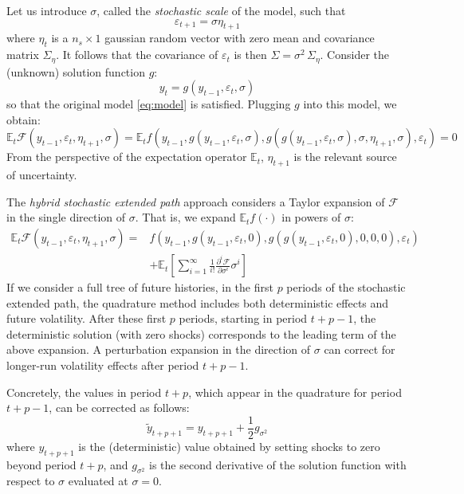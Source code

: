 \documentclass[a4paper,12pt]{amsart}
\begin{document}
Let us introduce $\sigma$, called the \emph{stochastic scale} of the model, such that
\[
   \varepsilon_{t+1} = \sigma \eta_{t+1}
\]
where $\eta_t$ is a $n_s\times 1$ gaussian random vector with zero mean
and covariance matrix $\Sigma_{\eta}$. It follows that the covariance of $\varepsilon_{t}$
is then $\Sigma = \sigma^2 \,\Sigma_{\eta}$. Consider the (unknown) solution function $g$:
\[
   y_t = g\left(y_{t-1}, \varepsilon_t, \sigma\right)
\]
so that the original model \ref{eq:model} is satisfied. Plugging $g$ into this model, we obtain:
\[
   \mathbb E_t\mathcal F\left( y_{t-1}, \varepsilon_t, \eta_{t+1}, \sigma\right)
   =
   \mathbb E_t f\left(
   y_{t-1},
   g\left(y_{t-1},\varepsilon_t,\sigma\right),
   g\left(g\left(y_{t-1}, \varepsilon_t,\sigma\right), \sigma, \eta_{t+1}, \sigma\right),
   \varepsilon_t\right) = 0
\]
From the perspective of the expectation operator $\mathbb E_t$, $\eta_{t+1}$ is the relevant source of uncertainty.\newline

The \emph{hybrid stochastic extended path} approach considers a Taylor expansion
of $\mathcal F$ in the single direction of $\sigma$. That is, we expand
$\mathbb E_t f(\cdot)$ in powers of $\sigma$:
\[
   \begin{split}
      \mathbb E_t\mathcal F\left( y_{t-1}, \varepsilon_t, \eta_{t+1}, \sigma\right) =
       & f\left(y_{t-1}, g\left(y_{t-1},\varepsilon_t,0\right),
      g\left(g\left(y_{t-1}, \varepsilon_t,0\right), 0, 0, 0\right),
      \varepsilon_t\right)                                                                                             \\
       & +\mathbb E_t\left[\sum_{i=1}^{\infty}\frac{1}{i!}\frac{\partial^i\mathcal F}{\partial\sigma^i}\sigma^i\right]
   \end{split}
\]
If we consider a full tree of future histories, in the first $p$
periods of the stochastic extended path, the quadrature method
includes both deterministic effects and future volatility. After these
first $p$ periods, starting in period $t+p-1$, the deterministic
solution (with zero shocks) corresponds to the leading term of the
above expansion.  A perturbation expansion in the direction
of $\sigma$ can correct for longer-run volatility effects after
period $t+p-1$.\newline

Concretely, the values in period $t+p$, which appear in the quadrature for period $t+p-1$, can be corrected
as follows:
\[
   \widetilde{y}_{t+p+1}
   = y_{t+p+1}
   +
   \frac{1}{2}g_{\sigma^2}
\]
where $y_{t+p+1}$ is the (deterministic) value obtained by setting shocks to zero
beyond period $t+p$, and $g_{\sigma^2}$ is the second derivative of the solution
function with respect to $\sigma$ evaluated at $\sigma = 0$.\newline
\end{document}
